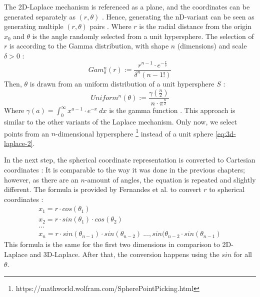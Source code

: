 The 2D-Laplace mechanism is referenced as a plane, and the coordinates can be generated separately as $(r, \theta)$ \citep{fernandes_generalised_2019,DBLP:journals/corr/abs-1212-1984}.
Hence, generating the nD-variant can be seen as generating multiple $(r, \theta)$ pairs \citep{fernandes_generalised_2019}.
Where $r$ is the radial distance from the origin $x_0$ and $\theta$ is the angle randomly selected from a unit hypersphere.
The selection of $r$ is according to the Gamma distribution, with shape $n$ (dimensions) and scale $\delta > 0$ \citep{fernandes_generalised_2019}:
\begin{equation}
  Gam^n_\delta(r) := \frac{r^{n-1}\cdot e^{-\frac{r}{\delta}}}{\delta^n(n-1!)}
  \label{eq:generate_r_for_nd_laplace}
\end{equation}
Then, $\theta$ is drawn from an uniform distribution of a unit hypersphere $S$ \citep{fernandes_generalised_2019}:
\begin{equation}
  Uniform^n(\theta) := \frac{\gamma(\frac{n}{2})}{n \cdot \pi ^{\frac{n}{2}}}
  \label{eq:generate_theta_for_nd_laplace}
\end{equation}
Where $\gamma(a) = \int^\infty_0 x^{a-1} \cdot e^{-x} \ dx$ is the gamma function \citep{fernandes_generalised_2019}.
This approach is similar to the other variants of the Laplace mechanism.
Only now, we select points from an $n$-dimensional hypersphere  \footnote{https://mathworld.wolfram.com/SpherePointPicking.html} instead of a unit sphere \ref{eq:3d-laplace-2}. \newline

In the next step, the spherical coordinate representation is converted to Cartesian coordinates \citep{fernandes_generalised_2019}:
It is comparable to the way it was done in the previous chapters; however, as there are an $n$-amount of angles, the equation is repeated and slightly different.
The formula is provided by Fernandes et al. to convert $r$ to spherical coordinates \citep{fernandes_generalised_2019}:
\begin{align*}
  x_1 = r \cdot cos (\theta_1)                                          \\
  x_2 = r \cdot sin (\theta_1) \cdot cos (\theta_2)                         \\
  ... \\
  x_n = r \cdot sin(\theta_{n-1}) \cdot sin(\theta_{n-2}) \ ..., sin(\theta_{n-2} \cdot sin(\theta_{n-1})
  \label{eq:nd-laplace-cartesian}
\end{align*}
This formula is the same for the first two dimensions in comparison to 2D-Laplace and 3D-Laplace. After that, the conversion happens using the $sin$ for all $\theta$.

